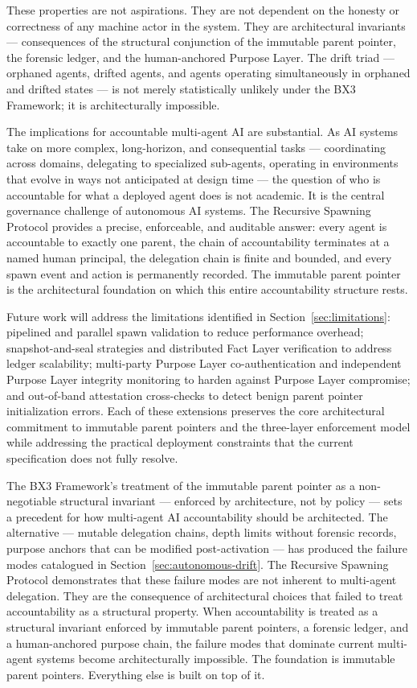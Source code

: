 These properties are not aspirations. They are not dependent on the honesty or correctness of any machine actor in the system. They are architectural invariants — consequences of the structural conjunction of the immutable parent pointer, the forensic ledger, and the human-anchored Purpose Layer. The drift triad — orphaned agents, drifted agents, and agents operating simultaneously in orphaned and drifted states — is not merely statistically unlikely under the BX3 Framework; it is architecturally impossible.

The implications for accountable multi-agent AI are substantial. As AI systems take on more complex, long-horizon, and consequential tasks — coordinating across domains, delegating to specialized sub-agents, operating in environments that evolve in ways not anticipated at design time — the question of who is accountable for what a deployed agent does is not academic. It is the central governance challenge of autonomous AI systems. The Recursive Spawning Protocol provides a precise, enforceable, and auditable answer: every agent is accountable to exactly one parent, the chain of accountability terminates at a named human principal, the delegation chain is finite and bounded, and every spawn event and action is permanently recorded. The immutable parent pointer is the architectural foundation on which this entire accountability structure rests.

Future work will address the limitations identified in Section~\ref{sec:limitations}: pipelined and parallel spawn validation to reduce performance overhead; snapshot-and-seal strategies and distributed Fact Layer verification to address ledger scalability; multi-party Purpose Layer co-authentication and independent Purpose Layer integrity monitoring to harden against Purpose Layer compromise; and out-of-band attestation cross-checks to detect benign parent pointer initialization errors. Each of these extensions preserves the core architectural commitment to immutable parent pointers and the three-layer enforcement model while addressing the practical deployment constraints that the current specification does not fully resolve.

The BX3 Framework's treatment of the immutable parent pointer as a non-negotiable structural invariant — enforced by architecture, not by policy — sets a precedent for how multi-agent AI accountability should be architected. The alternative — mutable delegation chains, depth limits without forensic records, purpose anchors that can be modified post-activation — has produced the failure modes catalogued in Section~\ref{sec:autonomous-drift}. The Recursive Spawning Protocol demonstrates that these failure modes are not inherent to multi-agent delegation. They are the consequence of architectural choices that failed to treat accountability as a structural property. When accountability is treated as a structural invariant enforced by immutable parent pointers, a forensic ledger, and a human-anchored purpose chain, the failure modes that dominate current multi-agent systems become architecturally impossible. The foundation is immutable parent pointers. Everything else is built on top of it.
